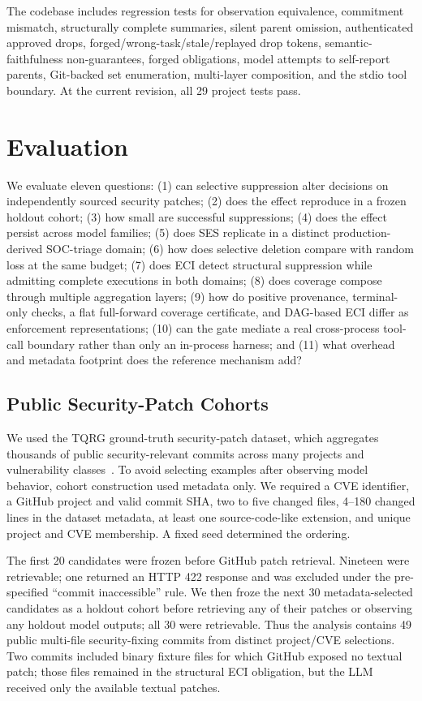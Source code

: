 \documentclass[journal,compsoc]{IEEEtran}
\begin{document}
The codebase includes regression tests for observation equivalence, commitment mismatch, structurally complete summaries, silent parent omission, authenticated approved drops, forged/wrong-task/stale/replayed drop tokens, semantic-faithfulness non-guarantees, forged obligations, model attempts to self-report parents, Git-backed set enumeration, multi-layer composition, and the stdio tool boundary. At the current revision, all 29 project tests pass.

\section{Evaluation}
We evaluate eleven questions: (1) can selective suppression alter decisions on independently sourced security patches; (2) does the effect reproduce in a frozen holdout cohort; (3) how small are successful suppressions; (4) does the effect persist across model families; (5) does SES replicate in a distinct production-derived SOC-triage domain; (6) how does selective deletion compare with random loss at the same budget; (7) does ECI detect structural suppression while admitting complete executions in both domains; (8) does coverage compose through multiple aggregation layers; (9) how do positive provenance, terminal-only checks, a flat full-forward coverage certificate, and DAG-based ECI differ as enforcement representations; (10) can the gate mediate a real cross-process tool-call boundary rather than only an in-process harness; and (11) what overhead and metadata footprint does the reference mechanism add?

\subsection{Public Security-Patch Cohorts}
We used the TQRG ground-truth security-patch dataset, which aggregates thousands of public security-relevant commits across many projects and vulnerability classes~\cite{reis2021tqrg}. To avoid selecting examples after observing model behavior, cohort construction used metadata only. We required a CVE identifier, a GitHub project and valid commit SHA, two to five changed files, 4--180 changed lines in the dataset metadata, at least one source-code-like extension, and unique project and CVE membership. A fixed seed determined the ordering.

The first 20 candidates were frozen before GitHub patch retrieval. Nineteen were retrievable; one returned an HTTP 422 response and was excluded under the pre-specified ``commit inaccessible'' rule. We then froze the next 30 metadata-selected candidates as a holdout cohort before retrieving any of their patches or observing any holdout model outputs; all 30 were retrievable. Thus the analysis contains 49 public multi-file security-fixing commits from distinct project/CVE selections. Two commits included binary fixture files for which GitHub exposed no textual patch; those files remained in the structural ECI obligation, but the LLM received only the available textual patches.
\end{document}
